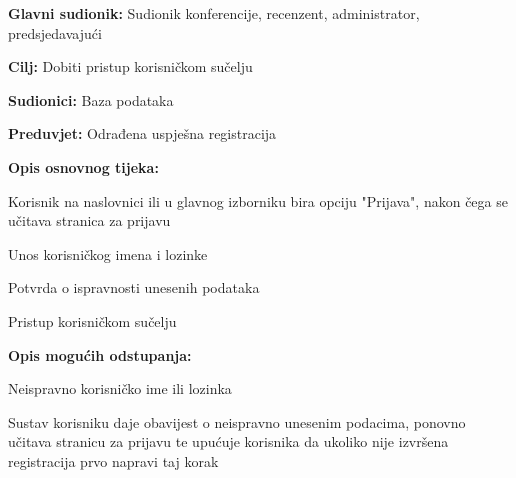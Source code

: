 					\noindent {}
					\begin{packed_item}
	
						\item \textbf{Glavni sudionik: } Sudionik konferencije, recenzent, administrator, predsjedavajući
						\item  \textbf{Cilj:} Dobiti pristup korisničkom sučelju
						\item  \textbf{Sudionici:} Baza podataka
						\item  \textbf{Preduvjet:} Odrađena uspješna registracija
						\item  \textbf{Opis osnovnog tijeka:}
						
						\item[] \begin{packed_enum}

							\item Korisnik na naslovnici ili u glavnog izborniku bira opciju "Prijava", nakon čega se učitava stranica za prijavu
							\item Unos korisničkog imena i lozinke
							\item Potvrda o ispravnosti unesenih podataka
							\item Pristup korisničkom sučelju
					
						\end{packed_enum}

						\item  \textbf{Opis mogućih odstupanja:}
						
						\item[] \begin{packed_item}
	
							\item[2.a]  Neispravno korisničko ime ili lozinka
							\item[] \begin{packed_enum}
								
								\item Sustav korisniku daje obavijest o neispravno unesenim podacima, ponovno učitava stranicu za prijavu te upućuje korisnika da ukoliko nije izvršena registracija prvo napravi taj korak
								
							\end{packed_enum}
							
						\end{packed_item}
			
					\end{packed_item}

